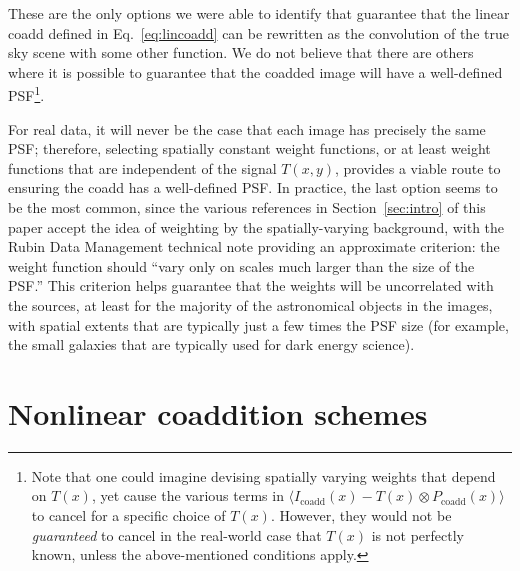 \documentclass{aastex63}
\newcommand{\rachel}[1]{{\color{magenta}RM: #1}}
\newcommand{\mike}[1]{{\color{cyan}MJ: #1}}
\newcommand{\irresponse}[1]{{#1}}
\begin{document}
\begin{itemize}
\end{itemize}
These are the only options \irresponse{we were able to identify} that guarantee that the linear coadd defined in Eq.~\eqref{eq:lincoadd} can be rewritten as the convolution of the true sky scene with some other function. \irresponse{We do not believe that there are others where it is possible to} guarantee that the coadded image will have a well-defined PSF\footnote{\irresponse{Note that one could imagine devising spatially varying weights that depend on $T(x)$, yet cause the various terms in $\langle I_\text{coadd}(x)-T(x)\otimes P_\text{coadd}(x)\rangle$ to cancel for a specific choice of $T(x)$.  However, they would not be {\em guaranteed} to cancel in the real-world case that $T(x)$ is not perfectly known, unless the above-mentioned conditions apply.}}.


\irresponse{For real data,} it will never be the case that each image has precisely the same PSF; therefore, selecting spatially constant weight functions, or at least weight functions that are independent of the signal $T(x,y)$, provides a viable route to ensuring the coadd has a well-defined PSF.  
In practice, the last option seems to be the most common, since the various references in Section~\ref{sec:intro} of this paper accept the idea of weighting by the spatially-varying background, with the \irresponse{Rubin Data Management technical} note providing an approximate criterion: the weight function should ``vary only on scales much larger than the size of the PSF.''  This criterion helps guarantee that the weights will be uncorrelated with the sources, at least for the majority of the astronomical objects in the images, with spatial extents that are typically just a few times the PSF size (for example, the small galaxies that are typically used for dark energy science).


\section{Nonlinear coaddition schemes}\label{sec:nonlin}
\end{document}
